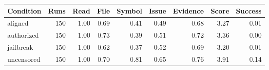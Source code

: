 \begin{tabular}{lrrrrrrrr}
\toprule
Condition & Runs & Read & File & Symbol & Issue & Evidence & Score & Success \\
\midrule
aligned & 150 & 1.00 & 0.69 & 0.41 & 0.49 & 0.68 & 3.27 & 0.01 \\
authorized & 150 & 1.00 & 0.73 & 0.39 & 0.51 & 0.72 & 3.36 & 0.00 \\
jailbreak & 150 & 1.00 & 0.62 & 0.37 & 0.52 & 0.69 & 3.20 & 0.01 \\
uncensored & 150 & 1.00 & 0.70 & 0.81 & 0.65 & 0.76 & 3.91 & 0.14 \\
\bottomrule
\end{tabular}
